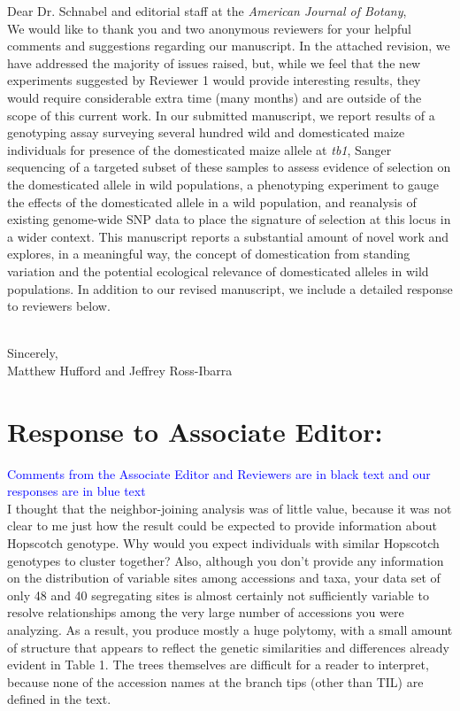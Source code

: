\documentclass[11pt]{article}
\newcommand{\res}[1]{\noindent \textcolor{blue}{{#1}} \\}
\begin{document}
\noindent Dear Dr. Schnabel and editorial staff at the \emph{American Journal of Botany}, \\

We would like to thank you and two anonymous reviewers for your helpful comments and suggestions regarding our manuscript.  In the attached revision, we have addressed the majority of issues raised, but, while we feel that the new experiments suggested by Reviewer 1 would provide interesting results, they would require considerable extra time (many months) and are outside of the scope of this current work.  In our submitted manuscript, we report results of a genotyping assay surveying several hundred wild and domesticated maize individuals for presence of the domesticated maize allele at \emph{tb1}, Sanger sequencing of a targeted subset of these samples to assess evidence of selection on the domesticated allele in wild populations, a phenotyping experiment to gauge the effects of the domesticated allele in a wild population, and reanalysis of existing genome-wide SNP data to place the signature of selection at this locus in a wider context.  This manuscript reports a substantial amount of novel work and explores, in a meaningful way, the concept of domestication from standing variation and the potential ecological relevance of domesticated alleles in wild populations. In addition to our revised manuscript, we include a detailed response to reviewers below.\\\

\noindent Sincerely,\\

\noindent Matthew Hufford and Jeffrey Ross-Ibarra

\section*{Response to Associate Editor:}

\res{Comments from the Associate Editor and Reviewers are in black text and our responses are in blue text}

I thought that the neighbor-joining analysis was of little value, because it was not clear to me just how the result could be expected to provide information about Hopscotch genotype.  Why would you expect individuals with similar Hopscotch genotypes to cluster together?  Also, although you don't provide any information on the distribution of variable sites among accessions and taxa, your data set of only 48 and 40 segregating sites is almost certainly not sufficiently variable to resolve relationships among the very large number of accessions you were analyzing.  As a result, you produce mostly a huge polytomy, with a small amount of structure that appears to reflect the genetic similarities and differences already evident in Table 1.  The trees themselves are difficult for a reader to interpret, because none of the accession names at the branch tips (other than TIL) are defined in the text.\\
\end{document}
